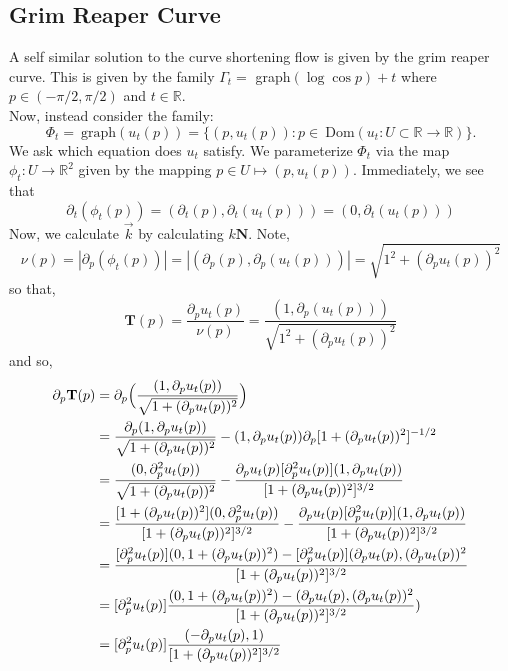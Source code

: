 \documentclass{article}
\begin{document}
\subsection{Grim Reaper Curve}

A self similar solution to the curve shortening flow is given by the grim reaper curve. This is given by the family
$\Gamma_t =$ graph$(\log \cos p)+t$ where $p\in(-\pi/2,\pi/2)$ and $t\in\mathbb{R}$.\\

Now, instead consider the family:
\[ \Phi_t =\:\text{graph}(u_t(p)) = \{(p,u_t(p)): p\in\:\text{Dom}(u_t:U\subset\mathbb{R}\to\mathbb{R})\}. \]
We ask which equation does $u_t$ satisfy. We parameterize $\Phi_t$ via the map $\phi_t: U\to \mathbb{R}^2$ given by
the mapping $p\in U\mapsto (p,u_t(p))$. Immediately, we see that
\[ \partial_t(\phi_t(p)) = (\partial_t(p),\partial_t(u_t(p))) = (0,\partial_t(u_t(p))) \]
Now, we calculate $\vec{k}$ by calculating $k\textbf{N}$. Note,
\[ \nu(p) = |\partial_p(\phi_t(p))| = |(\partial_p(p),\partial_p(u_t(p)))| = \sqrt{1^2 + (\partial_p u_t(p))^2}\]
so that,
\[ \mathbf{T}(p) = \frac{\partial_p u_t(p)}{\nu(p)} = \frac{(1,\partial_p(u_t(p)))}{\sqrt{1^2 + (\partial_p u_t(p))^2}}\]
and so,
\begin{align*}
    \partial_p \mathbf{T}(p) &= \partial_p\Big{(}\frac{(1,\partial_p u_t(p))}{\sqrt{1+(\partial_p u_t(p))^2}}\Big{)} \\
    &= \frac{\partial_p (1,\partial_p u_t(p))}{\sqrt{1+(\partial_p u_t(p))^2}} - (1,\partial_p u_t(p))\partial_p[1+(\partial_p u_t(p))^2]^{-1/2} \\
    &= \frac{(0,\partial_p^2 u_t(p))}{\sqrt{1+(\partial_p u_t(p))^2}} - \frac{\partial_p u_t(p)[\partial_p^2 u_t(p)](1,\partial_p u_t(p))}{[1+(\partial_p u_t(p))^2]^{3/2}} \\
    &= \frac{[1+(\partial_p u_t(p))^2](0,\partial_p^2 u_t(p))}{[1+(\partial_p u_t(p))^2]^{3/2}} - \frac{\partial_p u_t(p)[\partial_p^2 u_t(p)](1,\partial_p u_t(p))}{[1+(\partial_p u_t(p))^2]^{3/2}} \\
    &= \frac{[\partial_p^2 u_t(p)](0,1+(\partial_p u_t(p))^2) - [\partial_p^2 u_t(p)](\partial_p u_t(p),(\partial_p u_t(p))^2}{[1+(\partial_p u_t(p))^2]^{3/2}} \\
    &= [\partial_p^2 u_t(p)]\frac{(0,1+(\partial_p u_t(p))^2) - (\partial_p u_t(p),(\partial_p u_t(p))^2}{[1+(\partial_p u_t(p))^2]^{3/2}}) \\
    &= [\partial_p^2 u_t(p)]\frac{(-\partial_p u_t(p),1)}{[1+(\partial_p u_t(p))^2]^{3/2}}
\end{align*}
\end{document}
